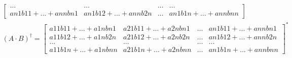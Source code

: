\documentclass{report}
\begin{document}
{\begin{enumerate}
\begin{align*}
\begin{bmatrix}
        \dots & \dots & \dots & \dots \\
       an1b11+...+annbn1 & an1b12+...+annb2n & \dots & an1b1n+...+annbnn
    \end{bmatrix}  \\   
    (A \cdot B)^\dagger= \begin{bmatrix}
        a11b11+...+a1nbn1 & a21b11+...+a2nbn1 & \dots & an1b11+...+annbn1 \\
        a11b12+...+a1nb2n & a21b12+...+a2nb2n & \dots & an1b12+...+annb2n \\
        \dots & \dots & \dots & \dots \\
       a11b1n+...+a1nbnn & a21b1n+...+a2nbnn & \dots & an1b1n+...+annbnn
    \end{bmatrix}^*
        \end{align*}
  \end{enumerate}
}
\end{document}
